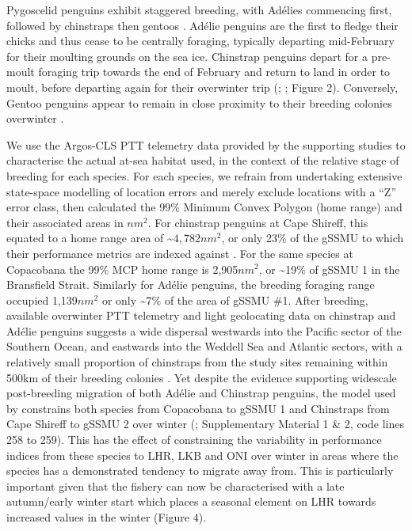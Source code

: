 \documentclass[]{elsarticle} %
\begin{document}
Pygoscelid penguins exhibit staggered breeding, with Adélies commencing
first, followed by chinstraps then gentoos \citep{Black2016}. Adélie
penguins are the first to fledge their chicks and thus cease to be
centrally foraging, typically departing mid-February for their moulting
grounds on the sea ice. Chinstrap penguins depart for a pre-moult
foraging trip towards the end of February and return to land in order to
moult, before departing again for their overwinter trip
(\citet{Hinke2015}; \citet{Hinke2019}; Figure 2). Conversely, Gentoo
penguins appear to remain in close proximity to their breeding colonies
overwinter .

We use the Argos-CLS PTT telemetry data provided by the supporting
studies to characterise the actual at-sea habitat used, in the context
of the relative stage of breeding for each species. For each species, we
refrain from undertaking extensive state-space modelling of location
errors and merely exclude locations with a ``Z'' error class, then
calculated the 99\% Minimum Convex Polygon (home range) and their
associated areas in \(nm^2\). For chinstrap penguins at Cape Shireff,
this equated to a home range area of \textasciitilde{}\(4,782nm^2\), or
only 23\% of the gSSMU to which their performance metrics are indexed
against \citep{Watters2020}. For the same species at Copacobana the 99\%
MCP home range is 2,905\(nm^2\), or \textasciitilde19\% of gSSMU 1 in
the Bransfield Strait. Similarly for Adélie penguins, the breeding
foraging range occupied 1,139\(nm^2\) or only \textasciitilde7\% of the
area of gSSMU \#1. After breeding, available overwinter PTT telemetry
and light geolocating data on chinstrap and Adélie penguins suggests a
wide dispersal westwards into the Pacific sector of the Southern Ocean,
and eastwards into the Weddell Sea and Atlantic sectors, with a
relatively small proportion of chinstraps from the study sites remaining
within 500km of their breeding colonies \citep{Hinke2019}. Yet despite
the evidence supporting widescale post-breeding migration of both Adélie
and Chinstrap penguins, the model used by \citet{Watters2020} constrains
both species from Copacobana to gSSMU 1 and Chinstraps from Cape Shireff
to gSSMU 2 over winter (\citet{Watters2020}; Supplementary Material 1 \&
2, code lines 258 to 259). This has the effect of constraining the
variability in performance indices from these species to LHR, LKB and
ONI over winter in areas where the species has a demonstrated tendency
to migrate away from. This is particularly important given that the
fishery can now be characterised with a late autumn/early winter start
which places a seasonal element on LHR towards increased values in the
winter (Figure 4).
\end{document}
